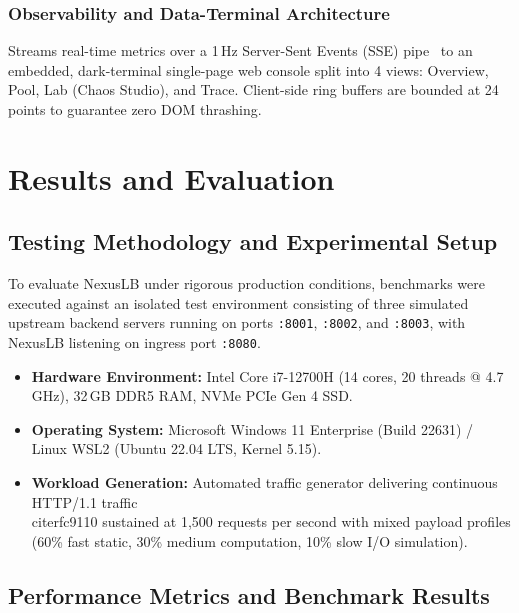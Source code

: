 \documentclass[12pt,openany]{report}
\begin{document}
\subsection{Observability and Data-Terminal Architecture}

Streams real-time metrics over a 1\,Hz Server-Sent Events (SSE) pipe~\cite{whatwg_sse} to an embedded, dark-terminal single-page web console split into 4 views: Overview, Pool, Lab (Chaos Studio), and Trace. Client-side ring buffers are bounded at 24 points to guarantee zero DOM thrashing.


\chapter{Results and Evaluation}

\section{Testing Methodology and Experimental Setup}

To evaluate NexusLB under rigorous production conditions, benchmarks were executed against an isolated test environment consisting of three simulated upstream backend servers running on ports \texttt{:8001}, \texttt{:8002}, and \texttt{:8003}, with NexusLB listening on ingress port \texttt{:8080}.

\begin{itemize}
  \item \textbf{Hardware Environment:} Intel Core i7-12700H (14 cores, 20 threads @ 4.7\,GHz), 32\,GB DDR5 RAM, NVMe PCIe Gen 4 SSD.
  \item \textbf{Operating System:} Microsoft Windows 11 Enterprise (Build 22631) / Linux WSL2 (Ubuntu 22.04 LTS, Kernel 5.15).
  \item \textbf{Workload Generation:} Automated traffic generator delivering continuous HTTP/1.1 traffic~\\cite{rfc9110} sustained at 1,500 requests per second with mixed payload profiles (60\% fast static, 30\% medium computation, 10\% slow I/O simulation).
\end{itemize}

\section{Performance Metrics and Benchmark Results}
\end{document}
